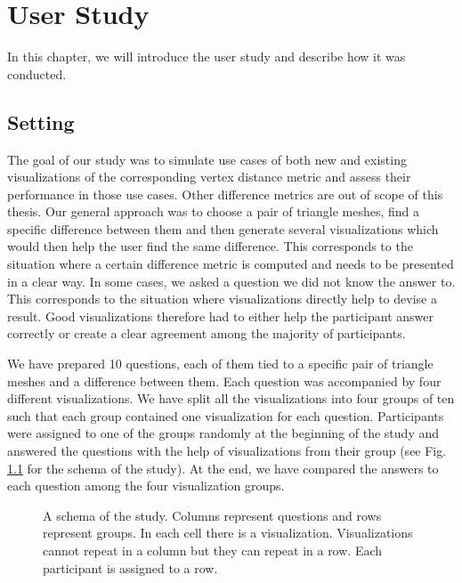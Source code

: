 \chapter{User Study}
\label{chap:user_study}

In this chapter, we will introduce the user study and describe how it was conducted.

\section{Setting}
\label{sec:user_study-setting}

The goal of our study was to simulate use cases of both new and existing visualizations of the corresponding vertex distance metric and assess their performance in those use cases. Other difference metrics are out of scope of this thesis. Our general approach was to choose a pair of triangle meshes, find a specific difference between them and then generate several visualizations which would then help the user find the same difference. This corresponds to the situation where a certain difference metric is computed and needs to be presented in a clear way. In some cases, we asked a question we did not know the answer to. This corresponds to the situation where visualizations directly help to devise a result. Good visualizations therefore had to either help the participant answer correctly or create a clear agreement among the majority of participants.

We have prepared 10 questions, each of them tied to a specific pair of triangle meshes and a difference between them. Each question was accompanied by four different visualizations. We have split all the visualizations into four groups of ten such that each group contained one visualization for each question. Participants were assigned to one of the groups randomly at the beginning of the study and answered the questions with the help of visualizations from their group (see Fig. \ref{fig:illustration-study_setting} for the schema of the study). At the end, we have compared the answers to each question among the four visualization groups.

\begin{figure}[h]
	\centering
	\def\svgwidth{\textwidth}
	
	\caption[Study Setting]{A schema of the study. Columns represent questions and rows represent groups. In each cell there is a visualization. Visualizations cannot repeat in a column but they can repeat in a row. Each participant is assigned to a row.}
	\label{fig:illustration-study_setting}
\end{figure}

